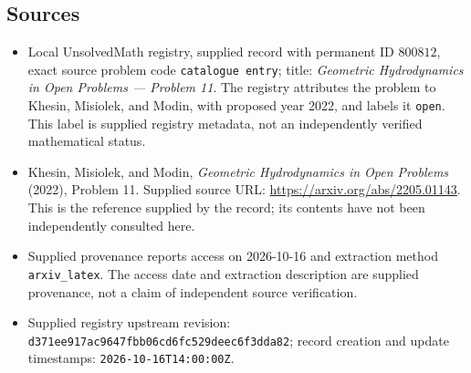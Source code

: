 \documentclass[11pt]{article}
\begin{document}
\subsection{Sources}
\begin{itemize}
\item Local UnsolvedMath registry, supplied record with permanent ID \(800812\), exact source problem code \texttt{catalogue entry}; title: \emph{Geometric Hydrodynamics in Open Problems --- Problem 11}. The registry attributes the problem to Khesin, Misiolek, and Modin, with proposed year 2022, and labels it \texttt{open}. This label is supplied registry metadata, not an independently verified mathematical status.
\item Khesin, Misiolek, and Modin, \emph{Geometric Hydrodynamics in Open Problems} (2022), Problem 11. Supplied source URL: \url{https://arxiv.org/abs/2205.01143}. This is the reference supplied by the record; its contents have not been independently consulted here.
\item Supplied provenance reports access on 2026-10-16 and extraction method \texttt{arxiv\_latex}. The access date and extraction description are supplied provenance, not a claim of independent source verification.
\item Supplied registry upstream revision: \texttt{d371ee917ac9647fbb06cd6fc529deec6f3dda82}; record creation and update timestamps: \texttt{2026-10-16T14:00:00Z}.
\end{itemize}
\end{document}

